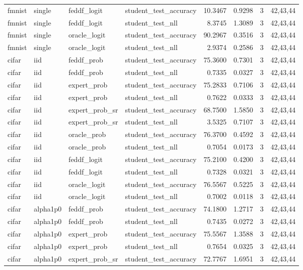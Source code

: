 \begin{tabular}{llllrrrl}
fmnist & single & feddf\_logit & student\_test\_accuracy & 10.3467 & 0.9298 & 3 & 42,43,44 \\
fmnist & single & feddf\_logit & student\_test\_nll & 8.3745 & 1.3089 & 3 & 42,43,44 \\
fmnist & single & oracle\_logit & student\_test\_accuracy & 90.2967 & 0.3516 & 3 & 42,43,44 \\
fmnist & single & oracle\_logit & student\_test\_nll & 2.9374 & 0.2586 & 3 & 42,43,44 \\
cifar & iid & feddf\_prob & student\_test\_accuracy & 75.3600 & 0.7301 & 3 & 42,43,44 \\
cifar & iid & feddf\_prob & student\_test\_nll & 0.7335 & 0.0327 & 3 & 42,43,44 \\
cifar & iid & expert\_prob & student\_test\_accuracy & 75.2833 & 0.7106 & 3 & 42,43,44 \\
cifar & iid & expert\_prob & student\_test\_nll & 0.7622 & 0.0333 & 3 & 42,43,44 \\
cifar & iid & expert\_prob\_sr & student\_test\_accuracy & 68.7500 & 1.5850 & 3 & 42,43,44 \\
cifar & iid & expert\_prob\_sr & student\_test\_nll & 3.5325 & 0.7107 & 3 & 42,43,44 \\
cifar & iid & oracle\_prob & student\_test\_accuracy & 76.3700 & 0.4592 & 3 & 42,43,44 \\
cifar & iid & oracle\_prob & student\_test\_nll & 0.7054 & 0.0173 & 3 & 42,43,44 \\
cifar & iid & feddf\_logit & student\_test\_accuracy & 75.2100 & 0.4200 & 3 & 42,43,44 \\
cifar & iid & feddf\_logit & student\_test\_nll & 0.7328 & 0.0321 & 3 & 42,43,44 \\
cifar & iid & oracle\_logit & student\_test\_accuracy & 76.5567 & 0.5225 & 3 & 42,43,44 \\
cifar & iid & oracle\_logit & student\_test\_nll & 0.7002 & 0.0118 & 3 & 42,43,44 \\
cifar & alpha1p0 & feddf\_prob & student\_test\_accuracy & 74.1800 & 1.2717 & 3 & 42,43,44 \\
cifar & alpha1p0 & feddf\_prob & student\_test\_nll & 0.7435 & 0.0272 & 3 & 42,43,44 \\
cifar & alpha1p0 & expert\_prob & student\_test\_accuracy & 75.5567 & 1.3588 & 3 & 42,43,44 \\
cifar & alpha1p0 & expert\_prob & student\_test\_nll & 0.7654 & 0.0325 & 3 & 42,43,44 \\
cifar & alpha1p0 & expert\_prob\_sr & student\_test\_accuracy & 72.7767 & 1.6951 & 3 & 42,43,44 \\

\end{tabular}
